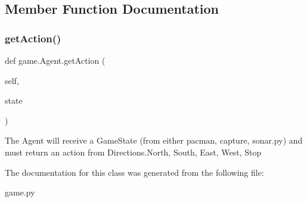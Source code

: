 \subsection{Member Function Documentation}
\mbox{\label{classgame_1_1_agent_a6de8008ed3294dd312ecb45a32f63084}} 
\subsubsection{\texorpdfstring{get\+Action()}{getAction()}}
{\footnotesize\ttfamily def game.\+Agent.\+get\+Action (\begin{DoxyParamCaption}\item[{}]{self,  }\item[{}]{state }\end{DoxyParamCaption})}

\begin{DoxyVerb}The Agent will receive a GameState (from either {pacman, capture, sonar}.py) and
must return an action from Directions.{North, South, East, West, Stop}
\end{DoxyVerb}
 

The documentation for this class was generated from the following file\+:\begin{DoxyCompactItemize}
\item 
game.\+py\end{DoxyCompactItemize}

